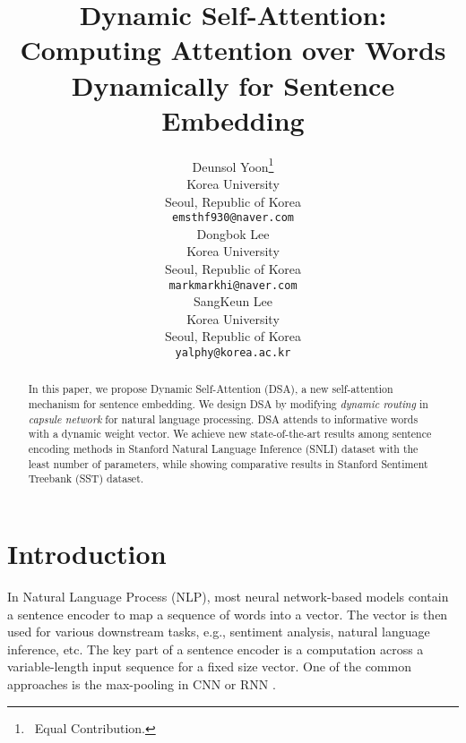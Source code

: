 \documentclass[11pt,a4paper]{article}
\begin{document}
\title{Dynamic Self-Attention: Computing Attention over Words Dynamically for Sentence Embedding}



\author{Deunsol Yoon\thanks{\, Equal Contribution. }\\
  Korea University \\
  Seoul, Republic of Korea \\
  {\tt emsthf930@naver.com} \\\And
  Dongbok Lee\footnotemark[1] \\
  Korea University \\
  Seoul, Republic of Korea \\
  {\tt markmarkhi@naver.com} \\\And
  SangKeun Lee \\
  Korea University \\
  Seoul, Republic of Korea \\
  {\tt yalphy@korea.ac.kr} \\}


\maketitle

\begin{abstract}

    In this paper, we propose Dynamic Self-Attention (DSA), a new self-attention mechanism for sentence embedding. We design DSA by modifying \textit{dynamic routing} in \textit{capsule network} \cite{capsule} for natural language processing. DSA attends to informative words with a dynamic weight vector. We achieve new state-of-the-art results among sentence encoding methods in Stanford Natural Language Inference (SNLI) dataset with the least number of parameters, while showing comparative results in Stanford Sentiment Treebank (SST) dataset.
    
\end{abstract}

\section{Introduction}\label{introduction}


In Natural Language Process (NLP), most neural network-based models contain a sentence encoder to map a sequence of words into a vector. The vector is then used for various downstream tasks, e.g., sentiment analysis, natural language inference, etc. The key part of a sentence encoder is a computation across a variable-length input sequence for a fixed size vector. One of the common approaches is the max-pooling in CNN or RNN \cite{yoonkim,infersent}.
\end{document}
